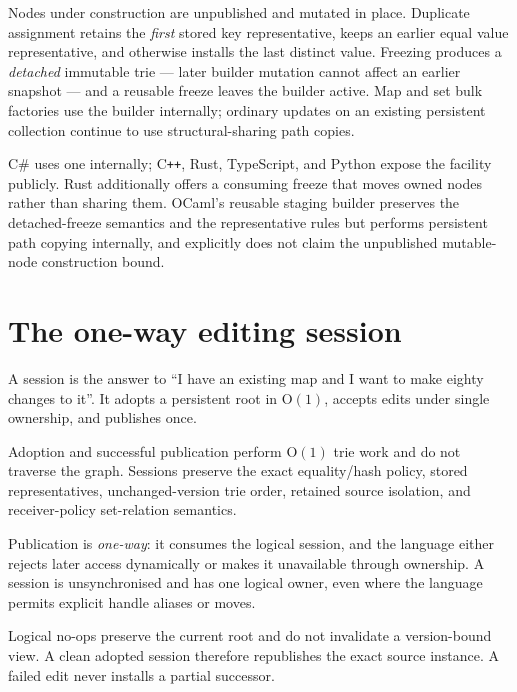 \documentclass[11pt,twoside,openright]{book}
\newcommand{\bigoh}[1]{$\mathrm{O}(#1)$}
\begin{document}
\begin{contractbox}
Nodes under construction are unpublished and mutated in place. Duplicate
assignment retains the \emph{first} stored key representative, keeps an earlier
equal value representative, and otherwise installs the last distinct value.
Freezing produces a \emph{detached} immutable trie --- later builder mutation
cannot affect an earlier snapshot --- and a reusable freeze leaves the builder
active. Map and set bulk factories use the builder internally; ordinary updates
on an existing persistent collection continue to use structural-sharing path
copies.
\end{contractbox}

C\# uses one internally; C\texttt{++}, Rust, TypeScript, and Python expose the
facility publicly. Rust additionally offers a consuming freeze that moves owned
nodes rather than sharing them. OCaml's reusable staging builder preserves the
detached-freeze semantics and the representative rules but performs persistent
path copying internally, and explicitly does not claim the unpublished
mutable-node construction bound.

\section{The one-way editing session}

A session is the answer to ``I have an existing map and I want to make eighty
changes to it''. It adopts a persistent root in \bigoh{1}, accepts edits under
single ownership, and publishes once.

\begin{contractbox}
Adoption and successful publication perform \bigoh{1} trie work and do not
traverse the graph. Sessions preserve the exact equality/hash policy, stored
representatives, unchanged-version trie order, retained source isolation, and
receiver-policy set-relation semantics.

Publication is \emph{one-way}: it consumes the logical session, and the language
either rejects later access dynamically or makes it unavailable through
ownership. A session is unsynchronised and has one logical owner, even where the
language permits explicit handle aliases or moves.

Logical no-ops preserve the current root and do not invalidate a version-bound
view. A clean adopted session therefore republishes the exact source instance.
A failed edit never installs a partial successor.
\end{contractbox}
\end{document}

